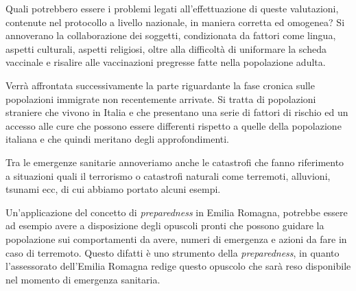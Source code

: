 Quali potrebbero essere i problemi legati all'effettuazione di queste
valutazioni, contenute nel protocollo a livello nazionale, in maniera
corretta ed omogenea? Si annoverano la collaborazione dei soggetti,
condizionata da fattori come lingua, aspetti culturali, aspetti
religiosi, oltre alla difficoltà di uniformare la scheda vaccinale e
risalire alle vaccinazioni pregresse fatte nella popolazione adulta.

Verrà affrontata successivamente la parte riguardante la fase cronica
sulle popolazioni immigrate non recentemente arrivate. Si tratta di
popolazioni straniere che vivono in Italia e che presentano una serie di
fattori di rischio ed un accesso alle cure che possono essere differenti
rispetto a quelle della popolazione italiana e che quindi meritano degli
approfondimenti.

Tra le emergenze sanitarie annoveriamo anche le catastrofi che fanno
riferimento a situazioni quali il terrorismo o catastrofi naturali come
terremoti, alluvioni, tsunami ecc, di cui abbiamo portato alcuni esempi.

Un'applicazione del concetto di \emph{preparedness} in Emilia Romagna,
potrebbe essere ad esempio avere a disposizione degli opuscoli pronti
che possono guidare la popolazione sui comportamenti da avere, numeri di
emergenza e azioni da fare in caso di terremoto. Questo difatti è uno
strumento della \emph{preparedness}, in quanto l'assessorato dell'Emilia
Romagna redige questo opuscolo che sarà reso disponibile nel momento di
emergenza sanitaria.